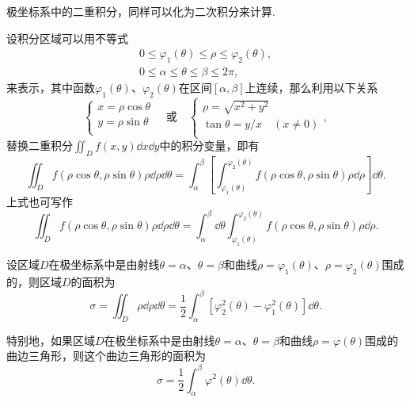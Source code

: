 极坐标系中的二重积分，同样可以化为二次积分来计算.
\begin{theorem}
设积分区域可以用不等式\begin{gather*}
0 \leq \varphi_1(\theta) \leq \rho \leq \varphi_2(\theta), \\
0 \leq \alpha \leq \theta \leq \beta \leq 2\pi,
\end{gather*}来表示，其中函数\(\varphi_1(\theta)\)、\(\varphi_2(\theta)\)在区间\([\alpha,\beta]\)上连续，那么利用以下关系\[
\left\{ \begin{array}{l}
x = \rho\cos\theta \\
y = \rho\sin\theta \\
\end{array} \right.
\quad\text{或}\quad
\left\{ \begin{array}{l}
\rho = \sqrt{x^2+y^2} \\
\tan\theta = y/x \quad (x \neq 0) \\
\end{array} \right.,
\]替换二重积分\(\iint_{D}{f(x,y)\dd{x}\dd{y}}\)中的积分变量，即有
\begin{equation}
\iint_D f(\rho\cos\theta,\rho\sin\theta) \rho \dd{\rho} \dd{\theta}
=\int_{\alpha}^{\beta} \left[
	\int_{\varphi_1(\theta)}^{\varphi_2(\theta)}
		f(\rho\cos\theta,\rho\sin\theta) \rho \dd{\rho} \right] \dd{\theta}.
\end{equation}
上式也可写作
\begin{equation}
\iint_D f(\rho\cos\theta,\rho\sin\theta) \rho \dd{\rho} \dd{\theta}
=\int_{\alpha}^{\beta} \dd{\theta}
	\int_{\varphi_1(\theta)}^{\varphi_2(\theta)}
		f(\rho\cos\theta,\rho\sin\theta) \rho \dd{\rho}.
\end{equation}
\end{theorem}

\begin{corollary}
设区域\(D\)在极坐标系中是由射线\(\theta=\alpha\)、\(\theta=\beta\)和曲线\(\rho=\varphi_1(\theta)\)、\(\rho=\varphi_2(\theta)\)围成的，则区域\(D\)的面积为
\begin{equation}
\sigma = \iint_D \rho \dd{\rho} \dd{\theta}
= \frac{1}{2} \int_{\alpha}^{\beta} [\varphi_2^2(\theta) - \varphi_1^2(\theta)] \dd{\theta}.
\end{equation}

特别地，如果区域\(D\)在极坐标系中是由射线\(\theta=\alpha\)、\(\theta=\beta\)和曲线\(\rho=\varphi(\theta)\)围成的曲边三角形，则这个曲边三角形的面积为
\begin{equation}
\sigma = \frac{1}{2} \int_{\alpha}^{\beta} \varphi^2(\theta) \dd{\theta}.
\end{equation}
\end{corollary}

